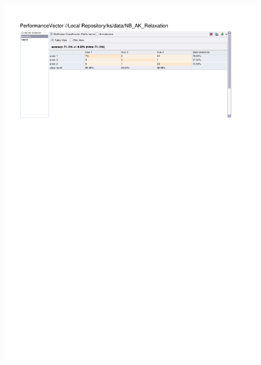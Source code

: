 \begin{figure}[htp]
  \centerline{\includegraphics[trim=0 680 0 60,clip,width=16.09cm]{results/NB_A_Relaxation.pdf}} \caption{
} \label{NB_K_Relaxation}
\end{figure}

